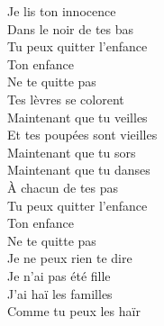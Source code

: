 \documentclass{novel}
\begin{document}
{\begin{minipage}[t][0.65\textheight][t]{\textwidth}
\begin{multicols}{2}
Je lis ton innocence\\
Dans le noir de tes bas\\
Tu peux quitter l'enfance\\
Ton enfance\\
Ne te quitte pas\\

Tes lèvres se colorent\\
Maintenant que tu veilles\\
Et tes poupées sont vieilles\\
Maintenant que tu sors\\

Maintenant que tu danses\\
À chacun de tes pas\\
Tu peux quitter l'enfance\\
Ton enfance\\
Ne te quitte pas\\

Je ne peux rien te dire\\
Je n'ai pas été fille\\
J'ai haï les familles\\
Comme tu peux les haïr

\end{multicols}
\end{minipage}
}
\end{document}
